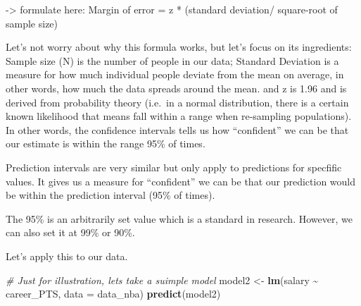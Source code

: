 \documentclass[
]{book}
\newenvironment{Shaded}{\begin{snugshade}}{\end{snugshade}}
\newcommand{\AttributeTok}[1]{\textcolor[rgb]{0.13,0.29,0.53}{#1}}
\newcommand{\CommentTok}[1]{\textcolor[rgb]{0.56,0.35,0.01}{\textit{#1}}}
\newcommand{\FunctionTok}[1]{\textcolor[rgb]{0.13,0.29,0.53}{\textbf{#1}}}
\newcommand{\NormalTok}[1]{#1}
\newcommand{\OtherTok}[1]{\textcolor[rgb]{0.56,0.35,0.01}{#1}}
\newcommand{\SpecialCharTok}[1]{\textcolor[rgb]{0.81,0.36,0.00}{\textbf{#1}}}
\begin{document}
-\textgreater{} formulate here: Margin of error = z * (standard deviation/ square-root of sample size)

Let's not worry about why this formula works, but let's focus on its ingredients: Sample size (N) is the number of people in our data; Standard Deviation is a measure for how much individual people deviate from the mean on average, in other words, how much the data spreads around the mean. and z is 1.96 and is derived from probability theory (i.e.~in a normal distribution, there is a certain known likelihood that means fall within a range when re-sampling populations). In other words, the confidence intervals tells us how ``confident'' we can be that our estimate is within the range 95\% of times.

Prediction intervals are very similar but only apply to predictions for specfific values. It gives us a measure for ``confident'' we can be that our prediction would be within the prediction interval (95\% of times).

The 95\% is an arbitrarily set value which is a standard in research. However, we can also set it at 99\% or 90\%.

Let's apply this to our data.

\begin{Shaded}
\begin{Highlighting}[]
\CommentTok{\# Just for illustration, let\textquotesingle{}s take a suimple model}
\NormalTok{model2 }\OtherTok{\textless{}{-}} \FunctionTok{lm}\NormalTok{(salary }\SpecialCharTok{\textasciitilde{}}\NormalTok{ career\_PTS, }\AttributeTok{data =}\NormalTok{ data\_nba)}
\FunctionTok{predict}\NormalTok{(model2)}
\end{Highlighting}
\end{Shaded}
\end{document}
